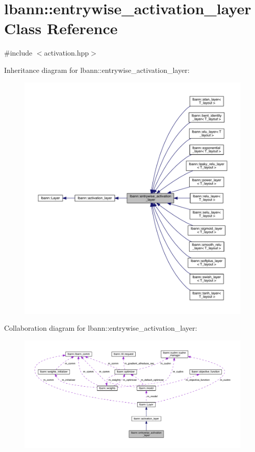 \hypertarget{classlbann_1_1entrywise__activation__layer}{}\section{lbann\+:\+:entrywise\+\_\+activation\+\_\+layer Class Reference}
\label{classlbann_1_1entrywise__activation__layer}


{\ttfamily \#include $<$activation.\+hpp$>$}



Inheritance diagram for lbann\+:\+:entrywise\+\_\+activation\+\_\+layer\+:\nopagebreak
\begin{figure}[H]
\begin{center}
\leavevmode
\includegraphics[width=350pt]{classlbann_1_1entrywise__activation__layer__inherit__graph}
\end{center}
\end{figure}


Collaboration diagram for lbann\+:\+:entrywise\+\_\+activation\+\_\+layer\+:\nopagebreak
\begin{figure}[H]
\begin{center}
\leavevmode
\includegraphics[width=350pt]{classlbann_1_1entrywise__activation__layer__coll__graph}
\end{center}
\end{figure}
